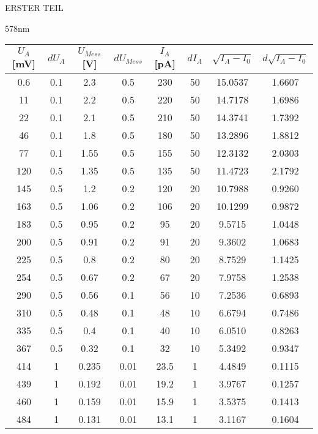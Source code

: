 \begin{appendix}
\begin{chapter}{ERSTER TEIL}
\begin{section}{578nm}
        \begin{table}[htbp]
          \centering
          \scriptsize
          \begin{tabular}{|c|c|c|c|c|c|c|c|}
            \hline
            $U_{A}$ [mV] & $dU_{A}$ & $U_{Mess}$ [V] & $dU_{Mess}$ & 
                $I_{A}$ [pA] & $dI_{A}$ & $\sqrt{I_{A}-I_0}$ & 
                $d\sqrt{I_{A}-I_0}$ \\ \hline
            0.6 & 0.1 & 2.3 & 0.5 & 230 & 50 & 15.0537 & 1.6607 \\ \hline
            11 & 0.1 & 2.2 & 0.5 & 220 & 50 & 14.7178 & 1.6986 \\ \hline
            22 & 0.1 & 2.1 & 0.5 & 210 & 50 & 14.3741 & 1.7392 \\ \hline
            46 & 0.1 & 1.8 & 0.5 & 180 & 50 & 13.2896 & 1.8812 \\ \hline
            77 & 0.1 & 1.55 & 0.5 & 155 & 50 & 12.3132 & 2.0303 \\ \hline
            120 & 0.5 & 1.35 & 0.5 & 135 & 50 & 11.4723 & 2.1792 \\ \hline
            145 & 0.5 & 1.2 & 0.2 & 120 & 20 & 10.7988 & 0.9260 \\ \hline
            163 & 0.5 & 1.06 & 0.2 & 106 & 20 & 10.1299 & 0.9872 \\ \hline
            183 & 0.5 & 0.95 & 0.2 & 95 & 20 & 9.5715 & 1.0448 \\ \hline
            200 & 0.5 & 0.91 & 0.2 & 91 & 20 & 9.3602 & 1.0683 \\ \hline
            225 & 0.5 & 0.8 & 0.2 & 80 & 20 & 8.7529 & 1.1425 \\ \hline
            254 & 0.5 & 0.67 & 0.2 & 67 & 20 & 7.9758 & 1.2538 \\ \hline
            290 & 0.5 & 0.56 & 0.1 & 56 & 10 & 7.2536 & 0.6893 \\ \hline
            310 & 0.5 & 0.48 & 0.1 & 48 & 10 & 6.6794 & 0.7486 \\ \hline
            335 & 0.5 & 0.4 & 0.1 & 40 & 10 & 6.0510 & 0.8263 \\ \hline
            367 & 0.5 & 0.32 & 0.1 & 32 & 10 & 5.3492 & 0.9347 \\ \hline
            414 & 1 & 0.235 & 0.01 & 23.5 & 1 & 4.4849 & 0.1115 \\ \hline
            439 & 1 & 0.192 & 0.01 & 19.2 & 1 & 3.9767 & 0.1257 \\ \hline
            460 & 1 & 0.159 & 0.01 & 15.9 & 1 & 3.5375 & 0.1413 \\ \hline
            484 & 1 & 0.131 & 0.01 & 13.1 & 1 & 3.1167 & 0.1604 \\ \hline

\end{tabular}
\end{table}
\end{section}
\end{chapter}
\end{appendix}
